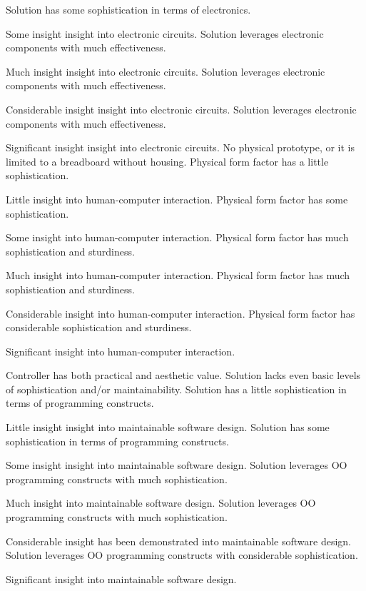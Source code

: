 \documentclass{../../fal_assignment}
\begin{document}
\begin{markingrubric}
        \grade Solution has some sophistication  in terms of electronics.
            \par Some insight insight into electronic circuits.
        \grade Solution leverages electronic components with much effectiveness.
            \par Much insight insight into electronic circuits.
        \grade Solution leverages electronic components with much effectiveness.
            \par Considerable insight insight into electronic circuits.
        \grade Solution leverages electronic components with much effectiveness.
            \par Significant insight insight into electronic circuits.
%
        \grade\fail No physical prototype, or it is limited to a breadboard without housing.
        \grade Physical form factor has a little sophistication.
            \par Little insight into human-computer interaction.
        \grade Physical form factor has some sophistication.
            \par Some insight into human-computer interaction.
        \grade Physical form factor has much sophistication and sturdiness.
            \par Much insight into human-computer interaction.
        \grade Physical form factor has much sophistication  and sturdiness.
            \par Considerable insight into human-computer interaction.
        \grade Physical form factor has considerable sophistication and sturdiness.
            \par Significant insight into human-computer interaction.
            \par Controller has both practical and aesthetic value.
%
        \grade\fail Solution lacks even basic levels of sophistication and/or maintainability.
        \grade Solution has a little sophistication in terms of programming constructs.
            \par Little insight insight into maintainable software design.
        \grade Solution has some sophistication in terms of programming constructs.
            \par Some insight insight into maintainable software design.
        \grade Solution leverages OO programming constructs with much sophistication.
            \par Much insight into maintainable software design.
        \grade Solution leverages OO programming constructs with much sophistication.
            \par Considerable insight has been demonstrated into maintainable software design.
        \grade Solution leverages OO programming constructs with considerable sophistication.
            \par Significant insight into maintainable software design.
\end{markingrubric}
\end{document}
